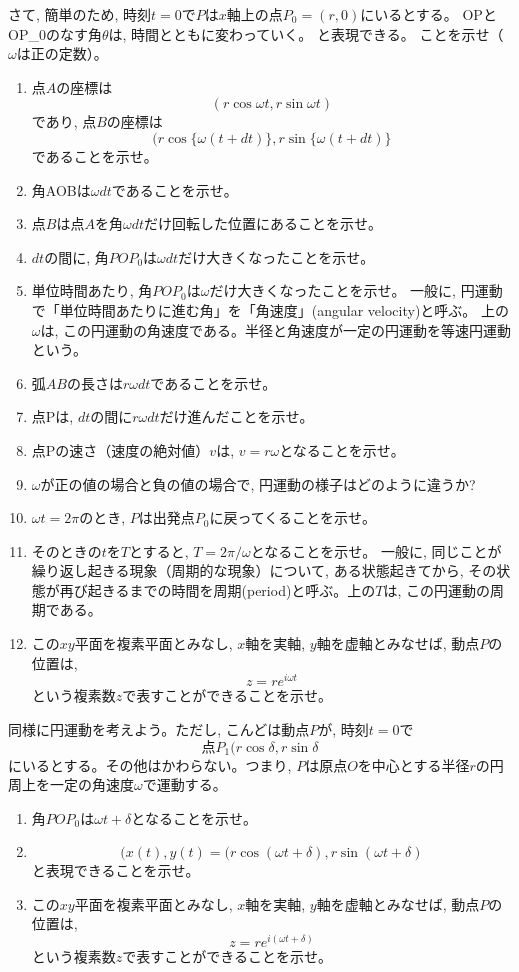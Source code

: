 \begin{faq}
{{さて, 簡単のため, 時刻$t=0$で$P$は$x$軸上の点$P_0=(r, 0)$にいるとする。
OPとOP_0のなす角$\theta$は, 時間とともに変わっていく。
と表現できる。
ことを示せ（$\omega$は正の定数）。
\begin{enumerate}
さて, 時刻$t$のとき, $P$は点Aにいて, そこから微小時間$dt$が経過したら$P$は点Bにいるとする。
\item 点$A$の座標は
\[(r\cos\omega t, r\sin\omega t)\]
であり, 点$B$の座標は
\[(r\cos\{\omega (t+dt)\}, r\sin\{\omega (t+dt)\}\]
であることを示せ。
\item 角AOBは$\omega dt$であることを示せ。
\item 点$B$は点$A$を角$\omega dt$だけ回転した位置にあることを示せ。
\item $dt$の間に, 角$POP_0$は$\omega dt$だけ大きくなったことを示せ。
\item 単位時間あたり, 角$POP_0$は$\omega$だけ大きくなったことを示せ。
一般に, 円運動で「単位時間あたりに進む角」を「角速度」(angular velocity)と呼ぶ。
上の$\omega$は, この円運動の角速度である。半径と角速度が一定の円運動を等速円運動という。
\item 弧$AB$の長さは$r\omega dt$であることを示せ。
\item 点Pは, $dt$の間に$r\omega dt$だけ進んだことを示せ。
\item 点Pの速さ（速度の絶対値）$v$は, $v=r\omega$となることを示せ。
\item $\omega$が正の値の場合と負の値の場合で, 円運動の様子はどのように違うか? 
\item $\omega t=2\pi$のとき, $P$は出発点$P_0$に戻ってくることを示せ。
\item そのときの$t$を$T$とすると, $T=2\pi/\omega$となることを示せ。
一般に, 同じことが繰り返し起きる現象（周期的な現象）について, ある状態起きてから, 
その状態が再び起きるまでの時間を周期(period)と呼ぶ。上の$T$は, この円運動の周期である。
\item この$xy$平面を複素平面とみなし, $x$軸を実軸, $y$軸を虚軸とみなせば, 動点$P$の位置は, 
\[z=re^{i\omega t}\]
という複素数$z$で表すことができることを示せ。
\end{enumerate}
\vspace{0.3cm}

\item 同様に円運動を考えよう。ただし, こんどは動点$P$が, 時刻$t=0$で
\[\text{点}P_1(r\cos\delta, r\sin\delta\]
にいるとする。その他はかわらない。つまり, $P$は原点$O$を中心とする半径$r$の円周上を一定の角速度$\omega$で運動する。
\begin{enumerate}
\item 角$POP_0$は$\omega t+\delta$となることを示せ。
\item
\[(x(t), y(t)=(r\cos(\omega t+\delta), r\sin(\omega t+\delta)\]
と表現できることを示せ。
\item この$xy$平面を複素平面とみなし, $x$軸を実軸, $y$軸を虚軸とみなせば, 動点$P$の位置は, 
\[z=re^{i(\omega t+\delta)}\]
という複素数$z$で表すことができることを示せ。
\end{enumerate}

}}
\end{faq}

